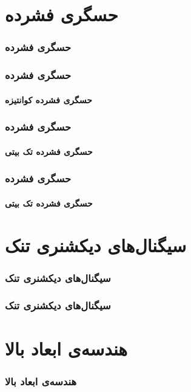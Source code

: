 \begin{frame}
\tableofcontents
\end{frame}


\section{حسگری فشرده\hfill}

\begin{frame}
\frametitle{حسگری فشرده}

\end{frame}

\begin{frame}
\frametitle{حسگری فشرده}
\framesubtitle{حسگری فشرده کوانتیزه}
\end{frame}

\begin{frame}
\frametitle{حسگری فشرده}
\framesubtitle{حسگری فشرده تک بیتی}
\end{frame}

\begin{frame}
\frametitle{حسگری فشرده}
\framesubtitle{حسگری فشرده تک بیتی}
\end{frame}


\section{سیگنال‌های دیکشنری تنک\hfill}

\begin{frame}
\frametitle{سیگنال‌های دیکشنری تنک}

\end{frame}

\begin{frame}
\frametitle{سیگنال‌های دیکشنری تنک}

\end{frame}

\section{هندسه‌ی ابعاد بالا\hfill}

\begin{frame}
\frametitle{هندسه‌ی ابعاد بالا}

\end{frame}

